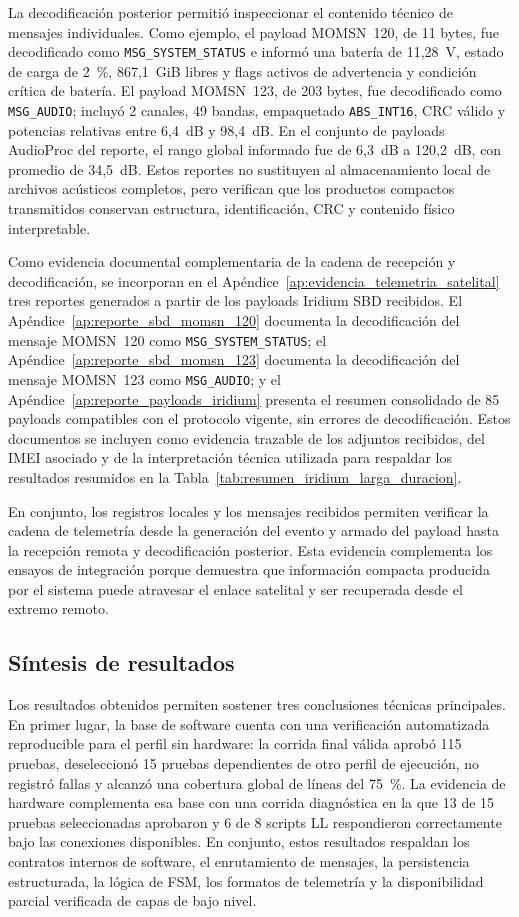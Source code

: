 La decodificación posterior permitió inspeccionar el contenido técnico de mensajes individuales. Como ejemplo, el payload MOMSN~120, de 11 bytes, fue decodificado como \texttt{MSG\_SYSTEM\_STATUS} e informó una batería de 11,28~V, estado de carga de 2~\%, 867,1~GiB libres y flags activos de advertencia y condición crítica de batería. El payload MOMSN~123, de 203 bytes, fue decodificado como \texttt{MSG\_AUDIO}; incluyó 2 canales, 49 bandas, empaquetado \texttt{ABS\_INT16}, CRC válido y potencias relativas entre 6,4~dB y 98,4~dB. En el conjunto de payloads AudioProc del reporte, el rango global informado fue de 6,3~dB a 120,2~dB, con promedio de 34,5~dB. Estos reportes no sustituyen al almacenamiento local de archivos acústicos completos, pero verifican que los productos compactos transmitidos conservan estructura, identificación, CRC y contenido físico interpretable.

Como evidencia documental complementaria de la cadena de recepción y decodificación, se incorporan en el Apéndice~\ref{ap:evidencia_telemetria_satelital} tres reportes generados a partir de los payloads Iridium SBD recibidos. El Apéndice~\ref{ap:reporte_sbd_momsn_120} documenta la decodificación del mensaje MOMSN~120 como \texttt{MSG\_SYSTEM\_STATUS}; el Apéndice~\ref{ap:reporte_sbd_momsn_123} documenta la decodificación del mensaje MOMSN~123 como \texttt{MSG\_AUDIO}; y el Apéndice~\ref{ap:reporte_payloads_iridium} presenta el resumen consolidado de 85 payloads compatibles con el protocolo vigente, sin errores de decodificación. Estos documentos se incluyen como evidencia trazable de los adjuntos recibidos, del IMEI asociado y de la interpretación técnica utilizada para respaldar los resultados resumidos en la Tabla~\ref{tab:resumen_iridium_larga_duracion}.

En conjunto, los registros locales y los mensajes recibidos permiten verificar la cadena de telemetría desde la generación del evento y armado del payload hasta la recepción remota y decodificación posterior. Esta evidencia complementa los ensayos de integración porque demuestra que información compacta producida por el sistema puede atravesar el enlace satelital y ser recuperada desde el extremo remoto.

\subsection{Síntesis de resultados}

Los resultados obtenidos permiten sostener tres conclusiones técnicas principales. En primer lugar, la base de software cuenta con una verificación automatizada reproducible para el perfil sin hardware: la corrida final válida aprobó 115 pruebas, deseleccionó 15 pruebas dependientes de otro perfil de ejecución, no registró fallas y alcanzó una cobertura global de líneas del 75~\%. La evidencia de hardware complementa esa base con una corrida diagnóstica en la que 13 de 15 pruebas seleccionadas aprobaron y 6 de 8 scripts LL respondieron correctamente bajo las conexiones disponibles. En conjunto, estos resultados respaldan los contratos internos de software, el enrutamiento de mensajes, la persistencia estructurada, la lógica de FSM, los formatos de telemetría y la disponibilidad parcial verificada de capas de bajo nivel.

